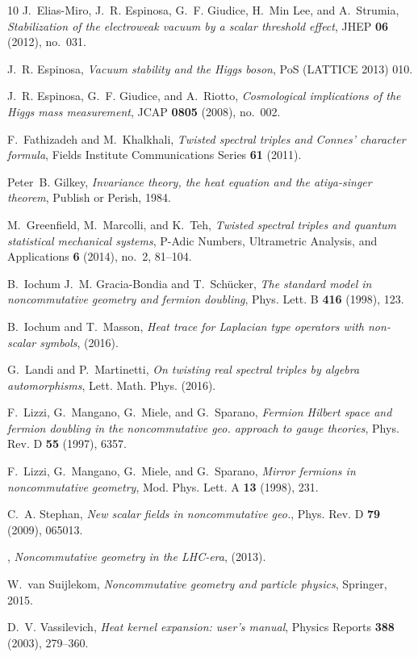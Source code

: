 \documentclass[11pt]{article}
\begin{document}
\begin{thebibliography}{10}
J.~Elias-Miro, J.~R. Espinosa, G.~F. Giudice, H.~Min Lee, and A.~Strumia,
  \emph{Stabilization of the electroweak vacuum by a scalar threshold effect},
  JHEP \textbf{06} (2012), no.~031.

J.~R. Espinosa, \emph{Vacuum stability and the {H}iggs boson}, PoS
(LATTICE 2013) 010.

J.~R. Espinosa, G.~F. Giudice, and A.~Riotto, \emph{Cosmological implications
  of the {H}iggs mass measurement}, JCAP \textbf{0805} (2008), no.~002.

F.~Fathizadeh and M.~Khalkhali, \emph{Twisted spectral triples and {C}onnes'
  character formula}, Fields Institute Communications Series \textbf{61}
  (2011).

Peter~B. Gilkey, \emph{Invariance theory, the heat equation and the
  atiya-singer theorem}, Publish or Perish, 1984.

M.~Greenfield, M.~Marcolli, and K.~Teh, \emph{Twisted spectral triples and
  quantum statistical mechanical systems}, {P}-{A}dic {N}umbers, {U}ltrametric
  {A}nalysis, and {A}pplications \textbf{6} (2014), no.~2, 81--104.

B.~Iochum J.~M. Gracia-Bondia and T.~Sch{\"u}cker, \emph{The standard model in
  noncommutative geometry and fermion doubling}, Phys. Lett. B \textbf{416}
  (1998), 123.

B.~Iochum and T.~Masson, \emph{{H}eat trace for {L}aplacian type operators with
  non-scalar symbols},  (2016).

G.~Landi and P.~Martinetti, \emph{On twisting real spectral triples by algebra
  automorphisms}, Lett. Math. Phys. (2016).

F.~Lizzi, G.~Mangano, G.~Miele, and G.~Sparano, \emph{Fermion {H}ilbert space
  and fermion doubling in the noncommutative geo. approach to gauge
  theories}, Phys. Rev. D \textbf{55} (1997), 6357.

F.~Lizzi, G.~Mangano, G.~Miele, and G.~Sparano, \emph{Mirror fermions in
  noncommutative geometry}, Mod. Phys. Lett. A \textbf{13} (1998), 231.

C.~A. Stephan, \emph{New scalar fields in noncommutative geo.}, Phys. Rev.
  D \textbf{79} (2009), 065013.

\bysame, \emph{Noncommutative geometry in the {LHC}-era},  (2013).

W.~van Suijlekom, \emph{Noncommutative geometry and particle physics},
  Springer, 2015.

D.~V. Vassilevich, \emph{Heat kernel expansion: user's manual}, Physics Reports
  \textbf{388} (2003), 279--360.

\end{thebibliography}

 
\end{document}
